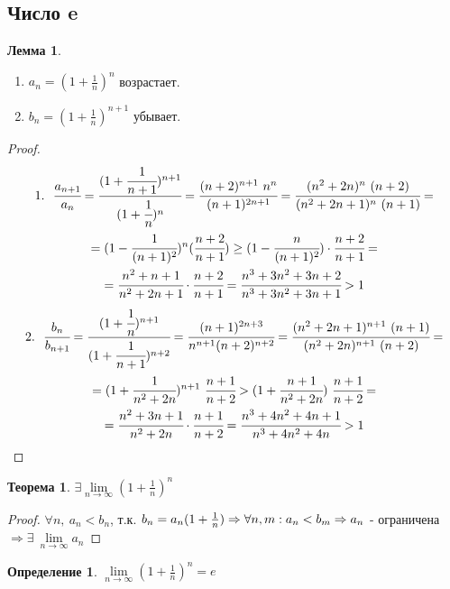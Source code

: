 \documentclass[a4paper, 12pt]{article}
\newcommand\tab[1][.5cm]{\hspace*{#1}}
\newcommand{\lims}{\lim\limits_{n\to \infty}}
\theoremstyle{definition}
\newtheorem*{definition}{Определение}
\newtheorem*{theorem}{Теорема}
\newtheorem*{lemma}{Лемма}
\begin{document}
    \subsection{Число e}
        \begin{lemma} \tab
            \begin{enumerate}
                \item $a_n=(1+\frac{1}{n})^n$ возрастает.
                \item $b_n=(1+\frac{1}{n})^{n+1}$ убывает.
            \end{enumerate}
        \end{lemma} 
        \begin{proof}
            \begin{multline*}
                1.\ \ \cfrac{a_{n+1}}{a_n}=\cfrac{(1+\cfrac{1}{n+1})^{n+1}}{(1+\cfrac{1}{n})^{n}}=\cfrac{(n+2)^{n+1}\ n^n}{(n+1)^{2n+1}}=\cfrac{(n^2+2n)^n\ (n+2)}{(n^2+2n+1)^n\ (n+1)}=
                \\=(1-\cfrac{1}{(n+1)^2})^n (\cfrac{n+2}{n+1})\geq(1-\cfrac{n}{(n+1)^2})\cdot \cfrac{n+2}{n+1}=\\
                =\cfrac{n^2+n+1}{n^2+2n+1}\cdot \cfrac{n+2}{n+1}=\cfrac{n^3+3n^2+3n+2}{n^3+3n^2+3n+1}>1
            \end{multline*}
            \begin{multline*}
                2.\ \ \cfrac{b_n}{b_{n+1}}=\cfrac{(1+\cfrac{1}{n})^{n+1}}{(1+\cfrac{1}{n+1})^{n+2}}=\cfrac{(n+1)^{2n+3}}{n^{n+1}(n+2)^{n+2}}=\cfrac{(n^2+2n+1)^{n+1}\ (n+1)}{(n^2+2n)^{n+1}\ (n+2)}=\\
                =(1+\cfrac{1}{n^2+2n})^{n+1}\ \cfrac{n+1}{n+2}>(1+\cfrac{n+1}{n^2+2n})\ \cfrac{n+1}{n+2}=\\
                =\cfrac{n^2+3n+1}{n^2+2n}\cdot \cfrac{n+1}{n+2}=\cfrac{n^3+4n^2+4n+1}{n^3+4n^2+4n}>1
            \end{multline*}
        \end{proof} 
        \begin{theorem}
            $\exists \lims (1+\frac{1}{n})^n$
        \end{theorem} 
        \begin{proof}
            $\forall n,\ a_n<b_n$, т.к. $b_n=a_n(1+\frac{1}{n})\Rightarrow \forall n,m: a_n<b_m\\
            \Rightarrow a_n$ - ограничена $\Rightarrow \exists\ \lims a_n$
        \end{proof} 
        \begin{definition}
            $\lims (1+\frac{1}{n})^n=e$
        \end{definition} 
\end{document}
